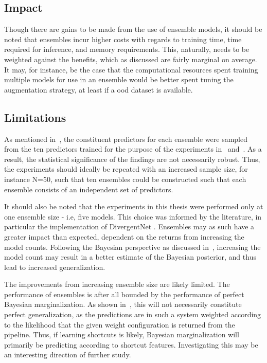     
    \subsection{Impact}
    Though there are gains to be made from the use of ensemble models, it should be noted that ensembles incur higher costs with regards to training time, time required for inference, and memory requirements. This, naturally, needs to be weighted against the benefits, which as discussed are fairly marginal on average. It may, for instance, be the case that the computational resources spent training multiple models for use in an ensemble would be better spent tuning the augmentation strategy, at least if a \gls{ood} dataset is available.
 
    \subsection{Limitations}
    As mentioned in~, the constituent predictors for each ensemble were sampled from the ten predictors trained for the purpose of the experiments in~ and~. As a result, the statistical significance of the findings are not necessarily robust. Thus, the experiments should ideally be repeated with an increased sample size, for instance N=50, such that ten ensembles could be constructed such that each ensemble consists of an independent set of predictors. 
    
    It should also be noted that the experiments in this thesis were performed only at one ensemble size - i.e, five models. This choice was informed by the literature, in particular the implementation of DivergentNet \cite{divergentnets}. Ensembles may as such have a greater impact than expected, dependent on the returns from increasing the model counts. Following the Bayesian perspective as discussed in~, increasing the model count may result in a better estimate of the Bayesian posterior, and thus lead to increased generalization.
    
    The improvements from increasing ensemble size are likely limited. The performance of ensembles is after all bounded by the performance of perfect Bayesian marginalization. As shown in~, this will not necessarily constitute perfect generalization, as the predictions are in such a system weighted according to the likelihood that the given weight configuration is returned from the pipeline. Thus, if learning shortcuts is likely, Bayesian marginalization will primarily be predicting according to shortcut features. Investigating this may be an interesting direction of further study.
    
